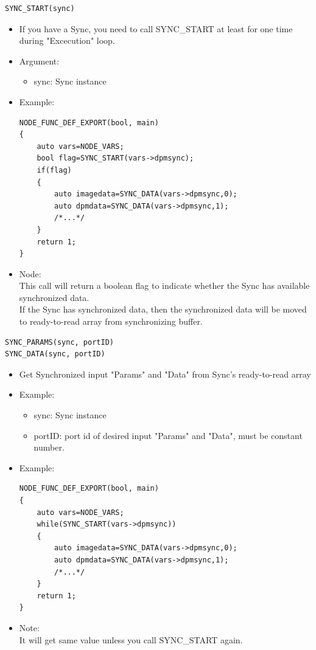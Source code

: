 \documentclass[a4paper,10pt]{book}
\begin{document}
\begin{mdframed}
\begin{verbatim}
SYNC_START(sync)
\end{verbatim}
\begin{itemize}
 \item If you have a Sync, you need to call SYNC\_START at least for one time during "Excecution" loop.
 \item Argument:
 \begin{itemize}
  \item sync: Sync instance
 \end{itemize}
 \item Example:
\begin{verbatim}
NODE_FUNC_DEF_EXPORT(bool, main)
{
    auto vars=NODE_VARS;
    bool flag=SYNC_START(vars->dpmsync);
    if(flag)
    {
        auto imagedata=SYNC_DATA(vars->dpmsync,0);
        auto dpmdata=SYNC_DATA(vars->dpmsync,1);
        /*...*/
    }
    return 1;
}
\end{verbatim}
\item Node: \\
This call will return a boolean flag to indicate whether the Sync has available synchronized data. \\
If the Sync has synchronized data, then the synchronized data will be moved to ready-to-read array from synchronizing buffer.
\end{itemize}
\end{mdframed}

\begin{mdframed}
\begin{verbatim}
SYNC_PARAMS(sync, portID)
SYNC_DATA(sync, portID)
\end{verbatim}
\begin{itemize}
 \item Get Synchronized input "Params" and "Data" from Sync's ready-to-read array
 \item Example:
 \begin{itemize}
  \item sync: Sync instance
  \item portID: port id of desired input "Params" and "Data", must be constant number.
 \end{itemize}
 \item Example:
\begin{verbatim}
NODE_FUNC_DEF_EXPORT(bool, main)
{
    auto vars=NODE_VARS;
    while(SYNC_START(vars->dpmsync))
    {
        auto imagedata=SYNC_DATA(vars->dpmsync,0);
        auto dpmdata=SYNC_DATA(vars->dpmsync,1);
        /*...*/
    }
    return 1;
}
\end{verbatim}
\item Note: \\ It will get same value unless you call SYNC\_START again.
\end{itemize}
\end{mdframed}
\end{document}
